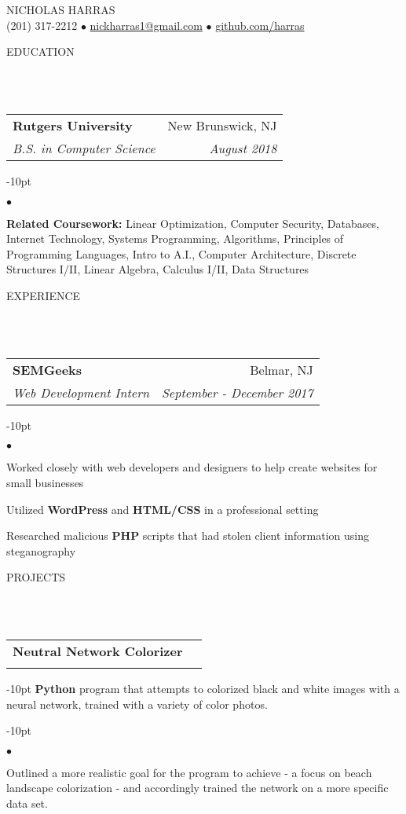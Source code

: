 \documentclass[12pt]{article}
\makeatletter
\newcommand{\lineunder}{
	\vspace*{-8pt} \\ 
	\hspace*{-18pt} 
	\hrulefill \\
}
\newcommand{\header}[1]{
	\vspace*{12pt}
	{\hspace*{-14pt}\vspace*{6pt} #1} %
	\vspace*{-6pt} 
	\lineunder
}
\newcommand{\contact}[2]{
	\vspace*{-8pt}
	\begin{center}
		{#1}\\ %
		#2
	\end{center}
	\vspace*{-12pt}
}
\newenvironment{achievements}{
\begin{adjustwidth}{-10pt}{}
  \begin{list}{$\bullet$}{
  	\topsep 0pt \itemsep -4pt}}
  	{\vspace*{2pt}\end{list}
\end{adjustwidth}
}
\newcommand{\mailto}[1]{
	\href{mailto:#1}{#1}
}
\newcommand{\subheading}[4]{
 	\vspace{5pt}
    	\begin{tabular*}{1.01\textwidth}
    		{l@{\extracolsep{\fill}}r}
      		\hspace{-16pt}\textbf{#1} & #2 \\
      		\hspace{-16pt}\textit{\small#3} & \textit{\small #4} \\
    	\end{tabular*}
    \vspace{-4pt}
}
\makeatother
\begin{document}
\small
\smallskip
\vspace*{-40pt}

\contact{\huge{N}\LARGE{ICHOLAS} \huge{H}\LARGE{ARRAS}}{(201) 317-2212 $\bullet$ \mailto{nickharras1@gmail.com} $\bullet$ \href{https://www.github.com/harras}{github.com/harras}}

\header{EDUCATION}

\subheading
	{Rutgers University}{New Brunswick, NJ}
	{B.S. in Computer Science}{August 2018}
	\begin{achievements}	
	\item{\bf Related Coursework:} Linear Optimization, Computer Security, Databases, Internet Technology, Systems Programming, Algorithms, Principles of Programming Languages, Intro to A.I., Computer Architecture, Discrete Structures I/II, Linear Algebra, Calculus I/II, Data Structures
	\end{achievements}

\header{EXPERIENCE}

\subheading
	{SEMGeeks}{Belmar, NJ}
	{Web Development Intern}{September - December 2017}
	\begin{achievements}
		\item Worked closely with web developers and designers to help create websites for small businesses
		\item Utilized \textbf{WordPress} and \textbf{HTML/CSS} in a professional setting
		\item Researched malicious \textbf{PHP} scripts that had stolen client information using steganography
	\end{achievements}


\header{PROJECTS}

\subheading{Neutral Network Colorizer}{}{}{}
	\vspace{-15pt}
	\begin{adjustwidth}{-10pt}{}
	\textbf{Python} program that attempts to colorized black and white images with a neural network, trained with a variety of color photos.
	\end{adjustwidth}
	\begin{achievements}
		\item Outlined a more realistic goal for the program to achieve - a focus on beach landscape colorization - and accordingly trained the network on a more specific data set. 
	\end{achievements}
	
\end{document}
